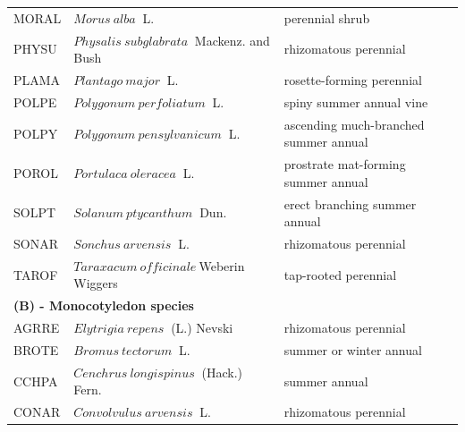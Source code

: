 \documentclass[
]{article}
\begin{document}
\begin{table}
\begin{tabular}[t]{l|l|l}
\hspace{1em}MORAL & $Morus~alba$$~$ L. & perennial shrub\\
 
\hspace{1em}PHYSU & $Physalis~subglabrata$$~$ Mackenz. and Bush & rhizomatous perennial\\
 
\hspace{1em}PLAMA & $Plantago~major$$~$ L. & rosette-forming perennial\\
 
\hspace{1em}POLPE & $Polygonum~perfoliatum$$~$ L. & spiny summer annual vine\\
 
\hspace{1em}POLPY & $Polygonum~pensylvanicum$$~$ L. & ascending much-branched summer annual\\
 
\hspace{1em}POROL & $Portulaca~oleracea$$~$ L. & prostrate mat-forming summer annual\\
 
\hspace{1em}SOLPT & $Solanum~ptycanthum$$~$ Dun. & erect branching summer annual\\
 
\hspace{1em}SONAR & $Sonchus~arvensis$$~$ L. & rhizomatous perennial\\
 
\hspace{1em}TAROF & $Taraxacum~officinale$$~$Weberin$~$Wiggers & tap-rooted perennial\\
 
\multicolumn{3}{l}{\textbf{(B) - Monocotyledon species}}\\
\hline
\hspace{1em}\hspace{1em}AGRRE & $Elytrigia~repens$$~$ (L.) Nevski & rhizomatous perennial\\
 
\hspace{1em}BROTE & $Bromus~tectorum$$~$ L. & summer or winter annual\\
 
\hspace{1em}CCHPA & $Cenchrus~longispinus$$~$ (Hack.) Fern. & summer annual\\
 
\hspace{1em}CONAR & $Convolvulus~arvensis$$~$ L. & rhizomatous perennial\\
 

\end{tabular}
\end{table}
\end{document}
